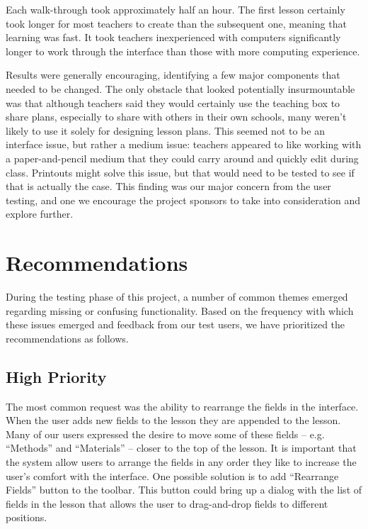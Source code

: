 \documentclass[10pt,letter,titlepage]{article}
\begin{document}
Each walk-through took approximately half an hour.  The first lesson certainly
took longer for most teachers to create than the subsequent one, meaning that
learning was fast.  It took teachers inexperienced with computers significantly
longer to work through the interface than those with more computing experience.

Results were generally encouraging, identifying a few major components that
needed to be changed.  The only obstacle that looked potentially insurmountable
was that although teachers said they would certainly use the teaching box to
share plans, especially to share with others in their own schools, many weren't
likely to use it solely for designing lesson plans.  This seemed not to be an
interface issue, but rather a medium issue: teachers appeared to like working
with a paper-and-pencil medium that they could carry around and quickly edit
during class.  Printouts might solve this issue, but that would need to be
tested to see if that is actually the case. This finding was our major concern
from the user testing, and one we encourage the project sponsors to take into
consideration and explore further.

\section{Recommendations}
\label{recommendations}
During the testing phase of this project, a number of common themes emerged
regarding missing or confusing functionality. Based on the frequency with which
these issues emerged and feedback from our test users, we have prioritized the
recommendations as follows.

\subsection{High Priority}
The most common request was the ability to rearrange the fields in the
interface. When the user adds new fields to the lesson they are appended to the
lesson. Many of our users expressed the desire to move some of these fields --
e.g. ``Methods'' and ``Materials'' -- closer to the top of the lesson. It is
important that the system allow users to arrange the fields in any order they
like to increase the user's comfort with the interface. One possible solution is
to add ``Rearrange Fields'' button to the toolbar. This button could bring up a
dialog with the list of fields in the lesson that allows the user to
drag-and-drop fields to different positions.
\end{document}

